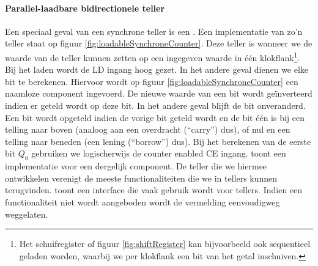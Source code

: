 \paragraph{Parallel-laadbare bidirectionele teller}
Een speciaal geval van een synchrone teller is een . Een implementatie van zo'n teller staat op figuur \ref{fig:loadableSynchroneCounter}. Deze teller is  wanneer we de waarde van de teller kunnen zetten op een ingegeven waarde in \'e\'en klokflank\footnote{Het schuifregister of figuur \ref{fig:shiftRegister} kan bijvoorbeeld ook sequentieel geladen worden, waarbij we per klokflank een bit van het getal inschuiven.}. Bij het laden wordt de LD ingang hoog gezet. In het andere geval dienen we elke bit te berekenen. Hiervoor wordt op figuur \ref{fig:loadableSynchroneCounter} een naamloze component ingevoerd. De nieuwe waarde van een bit wordt ge\"inverteerd indien er geteld wordt op deze bit. In het andere geval blijft de bit onveranderd. Een bit wordt opgeteld indien de vorige bit geteld wordt en de bit \'e\'en is bij een telling naar boven (analoog aan een overdracht (``carry'') dus), of nul en een telling naar beneden (een lening (``borrow'') dus). Bij het berekenen van de eerste bit $Q_0$ gebruiken we logischerwijs de counter enabled CE ingang.  toont een implementatie voor een dergelijk component. De teller die we hiermee ontwikkelen verenigt de meeste functionaliteiten die we in tellers kunnen terugvinden.  toont een interface die vaak gebruik wordt voor tellers. Indien een functionaliteit niet wordt aangeboden wordt de vermelding eenvoudigweg weggelaten.
